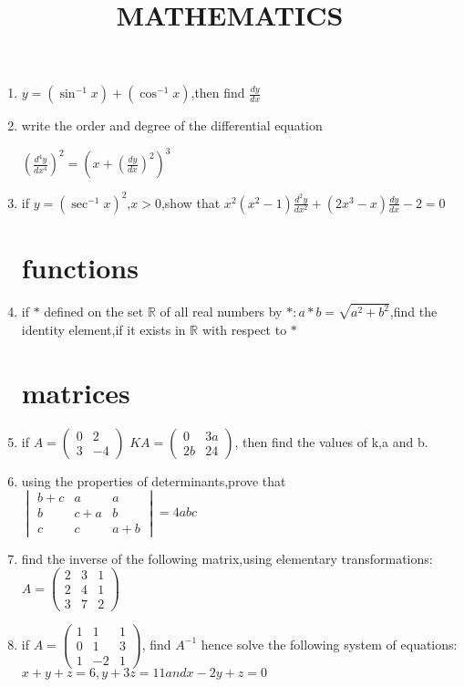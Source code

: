 \documentclass[10pt,-letter paper]{article}
\title{MATHEMATICS}
\providecommand{\brak}[1]{\ensuremath{\left(#1\right)}}
\newcommand{\myvec}[1]{\ensuremath{\begin{pmatrix}#1\end{pmatrix}}}
\newcommand{\mydet}[1]{\ensuremath{\begin{vmatrix}#1\end{vmatrix}}}
\begin{document}
\maketitle

\begin{enumerate}
\section{differentiation}
\item $y=(\sin^{-1}x)+(\cos^{-1}x)$,then find $\frac{dy}{dx}$
\item write the order and degree of the differential equation
                              
	$(\frac{d^4y}{dx^4})^2 = (x+(\frac{dy}{dx})^2)^3$
  \item if $y=\brak{\sec^{-1}x}^2$,$x>0$,show that $x^2{\brak{x^2-1}{\frac{d^2y}{dx^2}}+{\brak{2x^3-x}}{\frac{dy}{dx}}}-2=0$

\section{functions}	  
\item if $\ast$ defined on the set $\mathbb{R}$ of all real numbers by $\ast:a \ast b =\sqrt{a^2+b^2}$,find the identity element,if it exists in $\mathbb{R}$ with respect to $\ast$
\section{matrices}
\item if $A=\myvec{0&2\\3&-4}$
   $KA=\myvec{0&3a\\2b&24}$,
then find the values of k,a and b.
\item using the properties of determinants,prove that                                                                                        $\mydet{b+c & a & a \\                                                     b   & c+a & b \\                                                  c   & c   & a+b}= 4abc$
\item find the inverse of the following matrix,using elementary transformations:                                             
	$A=\myvec{2&3&1\\2&4&1\\3&7&2}$
\item if $A=\myvec{1&1&1\\0&1&3\\1&-2&1}$,
find $A^{-1}$ hence solve the following system of equations:                             $x+y+z=6,                                                          y+3z=11                                                      and x-2y+z=0 $

\end{enumerate}
\end{document}
